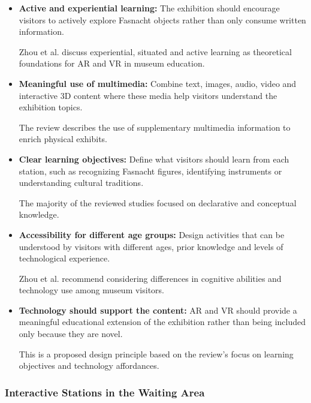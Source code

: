 \begin{itemize}
    \item \textbf{Active and experiential learning:}
    The exhibition should encourage visitors to actively
    explore Fasnacht objects rather than only consume
    written information.

    Zhou et al. discuss experiential, situated and active
    learning as theoretical foundations for AR and VR
    in museum education.
    \cite[p.~2]{zhou_meta-analytic_2022}

    \item \textbf{Meaningful use of multimedia:}
    Combine text, images, audio, video and interactive
    3D content where these media help visitors understand
    the exhibition topics.

    The review describes the use of supplementary
    multimedia information to enrich physical exhibits.
    \cite[pp.~6,~9]{zhou_meta-analytic_2022}

    \item \textbf{Clear learning objectives:}
    Define what visitors should learn from each station,
    such as recognizing Fasnacht figures, identifying
    instruments or understanding cultural traditions.

    The majority of the reviewed studies focused
    on declarative and conceptual knowledge.
    \cite[pp.~8,~12]{zhou_meta-analytic_2022}

    \item \textbf{Accessibility for different age groups:}
    Design activities that can be understood by visitors
    with different ages, prior knowledge and levels
    of technological experience.

    Zhou et al. recommend considering differences
    in cognitive abilities and technology use among
    museum visitors.
    \cite[p.~13]{zhou_meta-analytic_2022}

    \item \textbf{Technology should support the content:}
    AR and VR should provide a meaningful educational
    extension of the exhibition rather than being
    included only because they are novel.

    This is a proposed design principle based on the
    review's focus on learning objectives and
    technology affordances.
    \cite[pp.~5--6,~12]{zhou_meta-analytic_2022}

\end{itemize}


\subsubsection{Interactive Stations in the Waiting Area}

